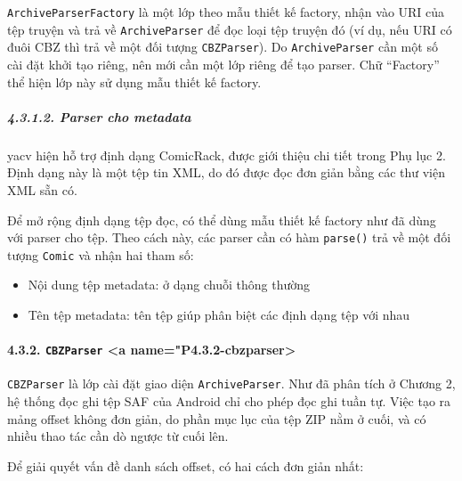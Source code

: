 \documentclass[
]{article}
\providecommand{\tightlist}{%
  \setlength{\itemsep}{0pt}\setlength{\parskip}{0pt}}
\begin{document}
\texttt{ArchiveParserFactory} là một lớp theo mẫu thiết kế factory, nhận
vào URI của tệp truyện và trả về \texttt{ArchiveParser} để đọc loại tệp
truyện đó (ví dụ, nếu URI có đuôi CBZ thì trả về một đối tượng
\texttt{CBZParser}). Do \texttt{ArchiveParser} cần một số cài đặt khởi
tạo riêng, nên mới cần một lớp riêng để tạo parser. Chữ ``Factory'' thể
hiện lớp này sử dụng mẫu thiết kế factory.

\hypertarget{parser-cho-metadata}{%
\subparagraph{4.3.1.2. Parser cho metadata}\label{parser-cho-metadata}}

yacv hiện hỗ trợ định dạng ComicRack, được giới thiệu chi tiết trong Phụ
lục 2. Định dạng này là một tệp tin XML, do đó được đọc đơn giản bằng
các thư viện XML sẵn có.

Để mở rộng định dạng tệp đọc, có thể dùng mẫu thiết kế factory như đã
dùng với parser cho tệp. Theo cách này, các parser cần có hàm
\texttt{parse()} trả về một đối tượng \texttt{Comic} và nhận hai tham
số:

\begin{itemize}
\tightlist
\item
  Nội dung tệp metadata: ở dạng chuỗi thông thường
\item
  Tên tệp metadata: tên tệp giúp phân biệt các định dạng tệp với nhau
\end{itemize}

\hypertarget{cbzparser-a-namep4.3.2-cbzparser}{%
\paragraph{\texorpdfstring{4.3.2. \texttt{CBZParser} \textless a
name="P4.3.2-cbzparser\textgreater{}}{4.3.2. CBZParser \textless a name="P4.3.2-cbzparser\textgreater{}}}\label{cbzparser-a-namep4.3.2-cbzparser}}

\texttt{CBZParser} là lớp cài đặt giao diện \texttt{ArchiveParser}. Như
đã phân tích ở Chương 2, hệ thống đọc ghi tệp SAF của Android chỉ cho
phép đọc ghi tuần tự. Việc tạo ra mảng offset không đơn giản, do phần
mục lục của tệp ZIP nằm ở cuối, và có nhiều thao tác cần dò ngược từ
cuối lên.

Để giải quyết vấn đề danh sách offset, có hai cách đơn giản nhất:
\end{document}
